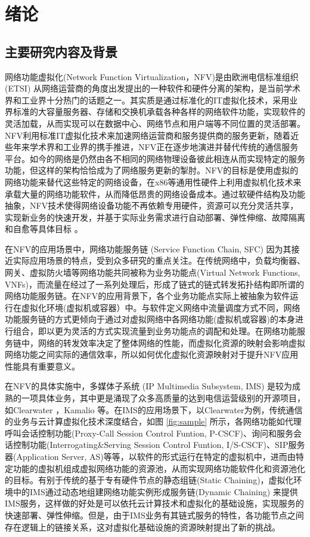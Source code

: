 \chapter{绪论}
\label{chap:Introduction}
\section{主要研究内容及背景}
网络功能虚拟化(Network Function Virtualization，NFV)是由欧洲电信标准组织 (ETSI) 从网络运营商的角度出发提出的一种软件和硬件分离的架构，是当前学术界和工业界十分热门的话题之一。其实质是通过标准化的IT虚拟化技术，采用业界标准的大容量服务器、存储和交换机承载各种各样的网络软件功能，实现软件的灵活加载，从而实现可以在数据中心、网络节点和用户端等不同位置的灵活部署。NFV利用标准IT虚拟化技术来加速网络运营商和服务提供商的服务更新，随着近些年来学术界和工业界的携手推进，NFV正在逐步地演进并替代传统的通信服务平台。如今的网络是仍然由各不相同的网络物理设备彼此相连从而实现特定的服务功能，但这样的架构恰恰成为了网络服务更新的掣肘。NFV的目标是使用虚拟的网络功能来替代这些特定的网络设备，在x86等通用性硬件上利用虚拟机化技术来承载大量的网络功能软件，从而降低昂贵的网络设备成本。通过软硬件结构及功能抽象，NFV技术使得网络设备功能不再依赖专用硬件，资源可以充分灵活共享，实现新业务的快速开发，并基于实际业务需求进行自动部署、弹性伸缩、故障隔离和自愈等具体目标 。
 
在NFV的应用场景中，网络功能服务链 (Service Function Chain, SFC) 因为其接近实际应用场景的特点，受到众多研究的重点关注。在传统网络中，负载均衡器、网关、虚拟防火墙等网络功能共同被称为业务功能点(Virtual Network Functions, VNFs)，而流量在经过了一系列处理后，形成了链式的链式转发拓扑结构即所谓的网络功能服务链。在NFV的应用背景下，各个业务功能点实际上被抽象为软件运行在虚拟化环境(虚拟机或容器）中。与软件定义网络中流量调度方式不同，网络功能服务链的方式更倾向于通过对虚拟网络中各网络功能(虚拟机或容器)的本身进行组合，即以更为灵活的方式实现流量到业务功能点的调配和处理。在网络功能服务链中，网络的转发效率决定了整体网络的性能，而虚拟化资源的映射会影响虚拟网络功能之间实际的通信效率，所以如何优化虚拟化资源映射对于提升NFV应用性能具有重要意义。

在NFV的具体实施中，多媒体子系统 (IP Multimedia Subsystem, IMS) 是较为成熟的一项具体业务，其中更是涌现了众多高质量的达到电信运营级别的开源项目，如Clearwater ，Kamalio 等。在IMS的应用场景下，以Clearwater为例，传统通信的业务与云计算虚拟化技术深度结合，如图 \ref{fig:sample} 所示，各网络功能如代理呼叫会话控制功能(Proxy-Call Session Control Funtion, P-CSCF)、询问和服务会话控制功能(Interrogating\&Serving Session Control Funtion, I/S-CSCF)、SIP服务器(Application Server, AS)等等，以软件的形式运行在特定的虚拟机中，进而由特定功能的虚拟机组成虚拟网络功能的资源池，从而实现网络功能软件化和资源池化的目标。有别于传统的基于专有硬件节点的静态组链(Static Chaining)，虚拟化环境中的IMS通过动态地组建网络功能实例形成服务链(Dynamic Chaining) 来提供IMS服务，这样做的好处是可以依托云计算技术和虚拟化的基础设施，实现服务的快速部署、弹性伸缩。但是，由于IMS业务有其链式服务的特性，各功能节点之间存在逻辑上的链接关系，这对虚拟化基础设施的资源映射提出了新的挑战。

